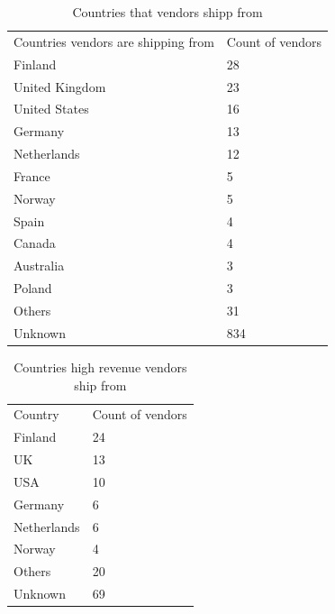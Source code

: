 \documentclass[
  digital, %
  table,   %
  lof,     %
  lot,     %
  oneside
]{fithesis3}
\begin{document}
\begin{table}
    \caption{Countries that vendors shipp from}
    \label{shipcount}
    \begin{tabular}{|l|l|}
    Countries vendors are shipping from  & Count of vendors\\
        Finland                                      & 28  \\ 
        United Kingdom                               & 23  \\ 
        United States                                & 16  \\ 
        Germany                                      & 13  \\ 
        Netherlands                                  & 12  \\ 
        France                                       & 5   \\ 
        Norway                                       & 5   \\ 
        Spain                                        & 4   \\ 
        Canada                                       & 4   \\ 
        Australia                                    & 3   \\ 
        Poland                                       & 3  \\  
        Others                                       & 31   \\
        Unknown                                      & 834  \\
    \end{tabular}
\end{table}

\begin{table}
    \caption{Countries high revenue vendors ship from}
    \label{richvendors}
    \begin{tabular}{|l|l|}
    Country & Count of vendors\\
Finland & 24 \\
UK & 13 \\
USA & 10 \\
Germany & 6 \\
Netherlands & 6 \\
Norway & 4 \\
Others & 20 \\ 
Unknown & 69 \\
    \end{tabular}
\end{table}
\end{document}
